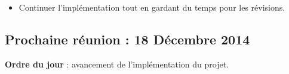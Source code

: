 \documentclass[12pt,a4paper]{article}
\begin{document}
\begin{itemize}[label = $\circledcirc$]
\item Continuer l'implémentation tout en gardant du temps pour les révisions.
\end{itemize}

\subsection*{Prochaine réunion : 18 Décembre 2014}

\textbf{Ordre du jour} : avancement de l'implémentation du projet.\\
\end{document}
